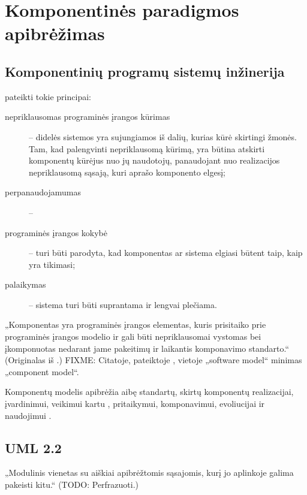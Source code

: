\chapter{Komponentinės paradigmos apibrėžimas}

\section{Komponentinių programų sistemų inžinerija}

\cite{analytical-study-cbse} pateikti tokie principai:
\begin{description}
  \item[nepriklausomas programinės įrangos kūrimas]  – didelės sistemos yra sujungiamos iš dalių,
    kurias kūrė skirtingi žmonės. Tam, kad palengvinti nepriklausomą
    kūrimą, yra būtina atskirti komponentų kūrėjus nuo jų naudotojų,
    panaudojant nuo realizacijos nepriklausomą sąsają, kuri aprašo
    komponento elgesį;
  \item[perpanaudojamumas]  – 
  \item[programinės įrangos kokybė]  – turi
    būti parodyta, kad komponentas ar sistema elgiasi būtent taip, kaip
    yra tikimasi;
  \item[palaikymas]  – sistema turi būti suprantama
    ir lengvai plečiama.
\end{description}

„Komponentas yra programinės įrangos elementas, kuris prisitaiko prie
programinės įrangos modelio ir gali būti nepriklausomai vystomas
bei įkomponuotas nedarant jame pakeitimų ir laikantis komponavimo
standarto.“\cite[438]{analytical-study-cbse} (Originalas iš
\cite{heineman2001component}.)
FIXME: Citatoje, pateiktoje \cite{classification-framework-for-scm},
vietoje „software model“ minimas „component model“.

\begin{defn}
  Komponentų modelis apibrėžia aibę standartų, skirtų komponentų
  realizacijai, įvardinimui, veikimui kartu ,
  pritaikymui, komponavimui, evoliucijai ir naudojimui .
\end{defn}

\section{UML 2.2}

„Modulinis vienetas su aiškiai apibrėžtomis sąsajomis, kurį jo
aplinkoje galima pakeisti kitu.“\cite[143]{UML-superstructure}
(TODO: Perfrazuoti.)

